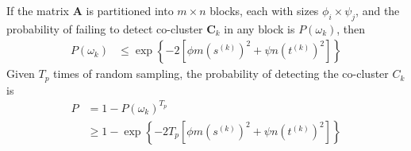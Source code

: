 
\appendix

\begin{theorem}
    \label{thm:probability_co_cluster_detection}
    If the matrix $\mathbf{A}$ is partitioned into $m \times n$ blocks, each with sizes $\phi_i \times \psi_j$, and the probability of failing to detect co-cluster $\mathbf{C}_k$ in any block is $P(\omega_k)$, then
    \begin{equation}
        \begin{split}
            P(\omega_k) & \le \exp \left\{ -2 [\phi m (s^{(k)})^2 + \psi n (t^{(k)})^2] \right\}
        \end{split}
    \end{equation}
    Given $T_p$ times of random sampling, the probability of detecting the co-cluster $C_k$ is
    \begin{equation}
        \begin{split}
            P & = 1 - P(\omega_k)^{T_p}                                                        \\
              & \ge 1 - \exp \left\{ -2 T_p [\phi m (s^{(k)})^2 + \psi n (t^{(k)})^2] \right\}
        \end{split}
    \end{equation}

\end{theorem}

